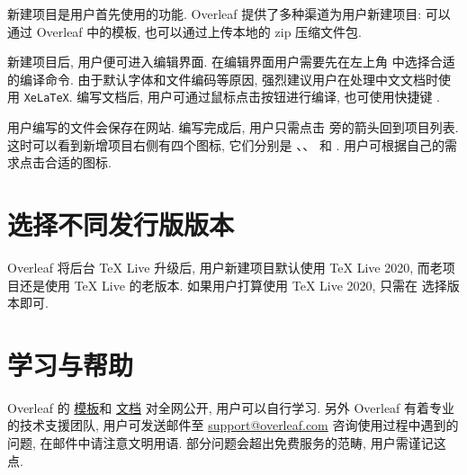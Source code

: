 新建项目是用户首先使用的功能.
Overleaf 提供了多种渠道为用户新建项目:
可以通过 Overleaf 中的模板,
也可以通过上传本地的 \textsf{zip} 压缩文件包.

新建项目后,
用户便可进入编辑界面.
在编辑界面用户需要先在左上角  中选择合适的编译命令.
由于默认字体和文件编码等原因,
强烈建议用户在处理中文文档时使用 \texttt{XeLaTeX}.
编写文档后,
用户可通过鼠标点击按钮进行编译,
也可使用快捷键 .

用户编写的文件会保存在网站.
编写完成后,
用户只需点击  旁的箭头回到项目列表.
这时可以看到新增项目右侧有四个图标,
它们分别是 、、 和 .
用户可根据自己的需求点击合适的图标.

\section{选择不同发行版版本}

Overleaf 将后台 \TeX{} Live 升级后,
用户新建项目默认使用 \TeX{} Live 2020,
而老项目还是使用 \TeX{} Live 的老版本.
如果用户打算使用 \TeX{} Live 2020,
只需在  选择版本即可.

\section{学习与帮助}

Overleaf 的%
\href{https://www.overleaf.com/latex/templates}{模板}和%
\href{https://www.overleaf.com/learn}{文档}%
对全网公开,
用户可以自行学习.
另外 Overleaf 有着专业的技术支援团队,
用户可发送邮件至 \href{mailto:support@overleaf.com}%
{\ttfamily support@overleaf.com}
咨询使用过程中遇到的问题,
在邮件中请注意文明用语.
部分问题会超出免费服务的范畴,
用户需谨记这点.